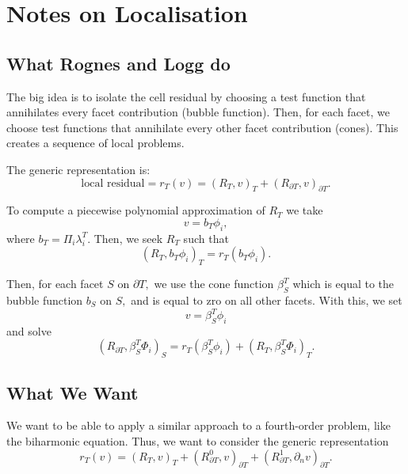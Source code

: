 \documentclass[12pt,a4paper]{article}
\begin{document}
\newpage

\section{Notes on Localisation}

\subsection{What Rognes and Logg do}

The big idea is to isolate the cell residual by choosing a test function that annihilates every facet contribution (bubble function). Then, for each facet, we choose test functions that annihilate every other facet contribution (cones). This creates a sequence of local problems. 

The generic representation is:
\begin{equation}
    \text{local residual} = r_T(v) =  (R_T, v)_T + (R_{\partial T}, v)_{\partial T}.  
\end{equation}

To compute a piecewise polynomial approximation of $R_T$ we take 
\begin{equation}
    v = b_T \phi_i,
\end{equation}
where $b_T = \Pi_{i} \lambda_i^T.$
Then, we seek $R_T$ such that 
\begin{equation}
    (R_T, b_T \phi_i)_T = r_T(b_T\phi_i).
\end{equation}


Then, for each facet $S$ on $\partial T,$ we use the cone function $\beta_S^T$ which is equal to the bubble function $b_S$ on $S,$ and is equal to zro on all other facets. With this, we set 
\begin{equation}
    v = \beta_S^T \phi_i
\end{equation}
and solve
\begin{equation}
(R_{\partial T}, \beta_S^T \Phi_i)_S = r_T(\beta_S^T \phi_i) + (R_T, \beta_S^T\Phi_i)_T.
\end{equation}


\subsection{What We Want} 

We want to be able to apply a similar approach to a fourth-order problem, like the biharmonic equation. Thus, we want to consider the generic representation
\begin{equation}
    r_T(v) = (R_T, v)_T + (R_{\partial T}^0, v)_{\partial T} + (R_{\partial T}^1, \partial_n v)_{\partial T}. 
\end{equation}
\end{document}
